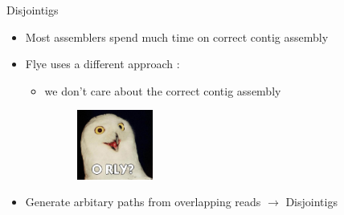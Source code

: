 \documentclass{beamer}
\begin{document}
  \begin{frame}{Disjointigs}
    \begin{itemize}[<+- | alert@+>]
      \item Most assemblers spend much time on correct contig assembly

      \item Flye uses a different approach \cite{kolmogorov_assembly_2019}:
      
      \begin{itemize}[<+- | alert@+>]
        \item we don't care about the correct contig assembly 
        \begin{figure}
          \includegraphics[width=2.5cm]{presentation/images/orly-owl.jpg}
          \label{fig:orly}
        \end{figure}
        
      \end{itemize}

      \item Generate arbitary paths from overlapping reads $\rightarrow$ Disjointigs
    \end{itemize}
  \end{frame}
\end{document}
